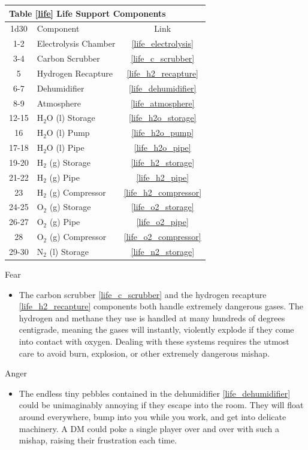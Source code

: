 \documentclass[a4paper]{article}
\begin{document}
\vspace{0.5cm} \hspace{0.25\linewidth}
\begin{tabular}{@{} | c | l | c | @{}}
\toprule
\multicolumn{3}{|l|}{Table \ref{life} Life Support Components} \\
\toprule
1d30 & Component & Link \\
\midrule
1-2 & Electrolysis Chamber & \ref{life_electrolysis} \\
3-4 & Carbon Scrubber & \ref{life_c_scrubber} \\
5 & Hydrogen Recapture & \ref{life_h2_recapture} \\
6-7 & Dehumidifier & \ref{life_dehumidifier} \\
8-9 & Atmosphere & \ref{life_atmosphere} \\
\midrule
12-15 & H$_2$O (l) Storage & \ref{life_h2o_storage} \\
16 & H$_2$O (l) Pump & \ref{life_h2o_pump} \\
17-18 & H$_2$O (l) Pipe & \ref{life_h2o_pipe} \\
19-20 & H$_2$ (g) Storage & \ref{life_h2_storage} \\
21-22 & H$_2$ (g) Pipe & \ref{life_h2_pipe} \\
23 & H$_2$ (g) Compressor & \ref{life_h2_compressor} \\
24-25 & O$_2$ (g) Storage & \ref{life_o2_storage} \\
26-27 & O$_2$ (g) Pipe & \ref{life_o2_pipe} \\
28 & O$_2$ (g) Compressor & \ref{life_o2_compressor} \\
29-30 & N$_2$ (l) Storage & \ref{life_n2_storage} \\
\bottomrule
\end{tabular}

\vspace{0.3cm}
\begin{minipage}[t]{0.4\linewidth}
Fear
\begin{itemize}
\item The carbon scrubber \ref{life_c_scrubber} and the hydrogen recapture \ref{life_h2_recapture} components both handle extremely dangerous gases. The hydrogen and methane they use is handled at many hundreds of degrees centigrade, meaning the gases will instantly, violently explode if they come into contact with oxygen. Dealing with these systems requires the utmost care to avoid burn, explosion, or other extremely dangerous mishap.
\end{itemize}
\end{minipage} 
\begin{minipage}[t]{0.4\linewidth}
Anger
\begin{itemize}
\item The endless tiny pebbles contained in the dehumidifier \ref{life_dehumidifier} could be unimaginably annoying if they escape into the room. They will float around everywhere, bump into you while you work, and get into delicate machinery. A DM could poke a single player over and over with such a mishap, raising their frustration each time.
\end{itemize}
\end{minipage}
\end{document}
